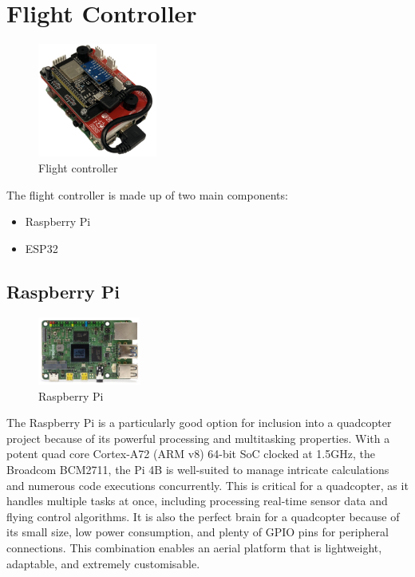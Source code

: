 \documentclass{report}
\begin{document}
\section{Flight Controller}\label{flight_controller}
\begin{figure}[H]
  \centering
  \includegraphics[width=0.35\textwidth]{Pictures/flight_controller.png}
  \caption{Flight controller}
  \label{fig:flightController}
\end{figure}
The flight controller is made up of two main components:
\begin{itemize}
  \item Raspberry Pi
  \item ESP32
\end{itemize}
\subsection{Raspberry Pi}
\begin{figure}[H]
  \centering
  \includegraphics[width=0.3\textwidth]{Pictures/raspberry_pi.png}
  \caption{Raspberry Pi}
  \label{fig:rasberry_pi}  
\end{figure}
The Raspberry Pi is a particularly good option for inclusion into a quadcopter
project because of its powerful processing and multitasking properties. With a
potent quad core Cortex-A72 (ARM v8) 64-bit SoC clocked at 1.5GHz, the Broadcom
BCM2711, the Pi 4B is well-suited to manage intricate calculations and numerous
code executions concurrently. This is critical for a quadcopter, as it handles
multiple tasks at once, including processing real-time sensor data and flying
control algorithms. It is also the perfect brain for a quadcopter because of its
small size, low power consumption, and plenty of GPIO pins for peripheral
connections. This combination enables an aerial platform that is lightweight,
adaptable, and extremely customisable.
\end{document}
